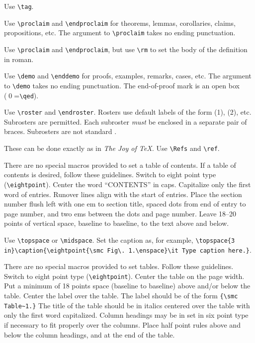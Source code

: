   Use \verb"\tag".

 Use \verb"\proclaim" and \verb"\endproclaim"
for theorems, lemmas, corollaries, claims, propositions, etc.  The
argument to \verb"\proclaim" takes no ending punctuation.

 Use \verb"\proclaim" and \verb"\endproclaim",
but use \verb"\rm" to set the body of the definition in roman.

 Use \verb"\demo" and \verb"\enddemo"
for proofs, examples, remarks, cases, etc.  The
argument to \verb"\demo" takes no ending punctuation.  The
end-of-proof mark is an open box (\qed\thinspace =\thinspace\verb"\qed").

  Use \verb"\roster" and \verb"\endroster".
Rosters use default labels of the form (1), (2), etc.
Subrosters are permitted.  Each subroster {\it must} be enclosed
in a separate pair of braces. Subrosters are not standard \AmSTeX.
 
 These can be done exactly as in {\it The Joy
of \TeX.}  Use \verb"\Refs" and \verb"\ref".

 There are no special macros provided to set
a table of contents.  If a table of contents is desired, follow these
guidelines.  Switch to eight point type (\verb"\eightpoint").
Center the word ``CONTENTS'' in caps.  Capitalize only the first word
of entries.  Runover lines align with the start of entries.
Place the section number flush left with one em to section title,
spaced dots from end of entry to page number, and two ems between the
dots and page number.  Leave 18--20 points of vertical space, baseline
to baseline, to the text above and below.

 Use \verb"\topspace" or \verb"\midspace".
Set the caption as, for example,
\verb"\topspace{3 in}\caption{\eightpoint{\smc Fig\. 1.\enspace}\it Type caption here.}".

 There are no special macros provided to set
tables.  Follow these guidelines.
Switch to eight point type (\verb"\eightpoint").
Center the table on the page width.  Put a minimum
of  18 points
space (baseline to baseline) above and/or below the table.
Center the label over the table.  The label
should be of the form \verb"{\smc Table~1.}"  The title of the table should
be in italics centered over the table with only the first word capitalized.
Column headings may be in set in six point type if necessary to fit properly
over the columns.  Place  half point rules
above and below the column headings, and at the end of the table.

